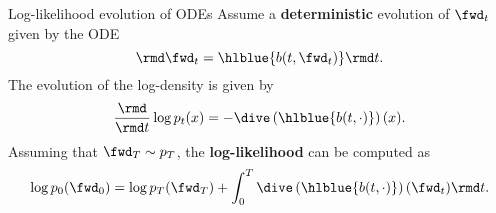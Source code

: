 \begin{frame}{Log-likelihood evolution of ODEs}
%
\vspace{-0.5em}
%
Assume a \textbf{deterministic} evolution of $\fwd_t$ given by the ODE
\begin{equation}
    \rmd \fwd_t = \hlblue{b(t, \fwd_t)} \rmd t.
\end{equation}
%
The evolution of the log-density is given by \cite{chen2018neural}
\begin{equation}
  \frac{\rmd}{\rmd t} \log p_t(x) = -\dive\left( \hlblue{b(t, \cdot)} \right) (x).
\end{equation}
\pause
%
Assuming that $\fwd_T \sim p_T$, the \textbf{log-likelihood} can be computed as
\begin{equation}
    \log p_0(\fwd_0) = \log p_T(\fwd_T) + \int_0^T  \dive \left( \hlblue{b(t, \cdot)} \right)(\fwd_t) \rmd t.
\end{equation}
\end{frame}

